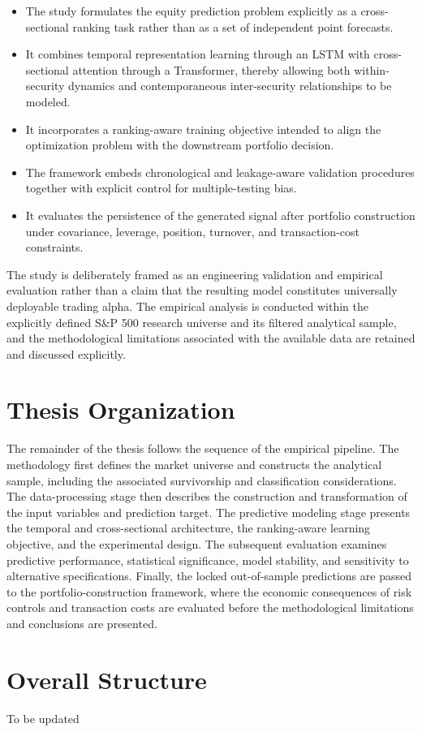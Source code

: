 \begin{itemize}[leftmargin=2.2cm, topsep=0pt, parsep=0pt]
	\item[\textit{First},] The study formulates the equity prediction problem explicitly as a cross-sectional ranking task rather than as a set of independent point forecasts.
	\item[\textit{Second},] It combines temporal representation learning through an \acs{LSTM} with cross-sectional attention through a Transformer, thereby allowing both within-security dynamics and contemporaneous inter-security relationships to be modeled.
	\item[\textit{Third},] It incorporates a ranking-aware training objective intended to align the optimization problem with the downstream portfolio decision.
	\item[\textit{Fourth},] The framework embeds chronological and leakage-aware validation procedures together with explicit control for multiple-testing bias.
	\item[\textit{Finally},] It evaluates the persistence of the generated signal after portfolio construction under covariance, leverage, position, turnover, and transaction-cost constraints.
\end{itemize}

\medskip

The study is deliberately framed as an engineering validation and empirical evaluation rather than a claim that the resulting model constitutes universally deployable trading alpha. The empirical analysis is conducted within the explicitly defined S\&P 500 research universe and its filtered analytical sample, and the methodological limitations associated with the available data are retained and discussed explicitly.

\section{Thesis Organization} \label{sec:thesis-organization}
The remainder of the thesis follows the sequence of the empirical pipeline. The methodology first defines the market universe and constructs the analytical sample, including the associated survivorship and classification considerations. The data-processing stage then describes the construction and transformation of the input variables and prediction target. The predictive modeling stage presents the temporal and cross-sectional architecture, the ranking-aware learning objective, and the experimental design. The subsequent evaluation examines predictive performance, statistical significance, model stability, and sensitivity to alternative specifications. Finally, the locked out-of-sample predictions are passed to the portfolio-construction framework, where the economic consequences of risk controls and transaction costs are evaluated before the methodological limitations and conclusions are presented.

\section{Overall Structure} \label{sec:overall-structure}
To be updated